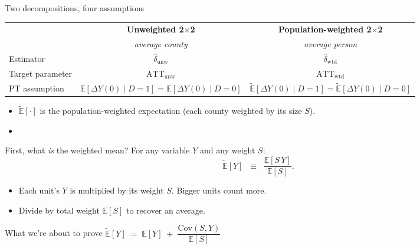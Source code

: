 \documentclass[aspectratio=169,11pt]{beamer}
\begin{document}
\begin{frame}{Two decompositions, four assumptions}
\vspace{0.5em}
\begin{center}
\renewcommand{\arraystretch}{1.5}
\footnotesize
\begin{tabular}{@{}l c c@{}}
\toprule
 & \textbf{Unweighted 2$\times$2} & \textbf{Population-weighted 2$\times$2} \\
 & \textit{average county} & \textit{average person} \\
\midrule
Estimator & $\widehat{\delta}_{\text{unw}}$ & $\widehat{\delta}_{\text{wtd}}$ \\
Target parameter & $\text{ATT}_{\text{unw}}$ & $\text{ATT}_{\text{wtd}}$ \\
PT assumption & $\mathbb{E}[\Delta Y(0) \mid D=1] = \mathbb{E}[\Delta Y(0) \mid D=0]$ & $\widetilde{\mathbb{E}}[\Delta Y(0) \mid D=1] = \widetilde{\mathbb{E}}[\Delta Y(0) \mid D=0]$ \\
\bottomrule
\end{tabular}
\end{center}
\vspace{0.6em}
\begin{itemize}\small
  \item $\widetilde{\mathbb{E}}[\cdot]$ is the population-weighted expectation (each county weighted by its size $S$).
  \item {}
\end{itemize}
\end{frame}

\begin{frame}{First, what \textit{is} the weighted mean?}
\vspace{0.4em}
For any variable $Y$ and any weight $S$:
\vspace{-0.2em}
\[
\widetilde{\mathbb{E}}[Y] \;\;\equiv\;\; \frac{\mathbb{E}[S\, Y]}{\mathbb{E}[S]}.
\]
\vspace{-0.4em}
\begin{itemize}\small
  \item Each unit's $Y$ is multiplied by its weight $S$. Bigger units count more.
  \item Divide by total weight $\mathbb{E}[S]$ to recover an average.
\end{itemize}
\vspace{0.4em}
\begin{block}{What we're about to prove}
\centering
$\widetilde{\mathbb{E}}[Y] \;=\; \mathbb{E}[Y] \;+\; \dfrac{\mathrm{Cov}(S, Y)}{\mathbb{E}[S]}$
\end{block}
\end{frame}
\end{document}
